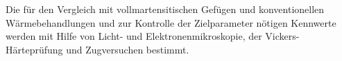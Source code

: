 Die für den Vergleich mit vollmartensitischen Gefügen und konventionellen Wärmebehandlungen und zur Kontrolle der Zielparameter nötigen Kennwerte werden mit Hilfe von Licht- und Elektronenmikroskopie, der Vickers-Härteprüfung und Zugversuchen bestimmt. 




